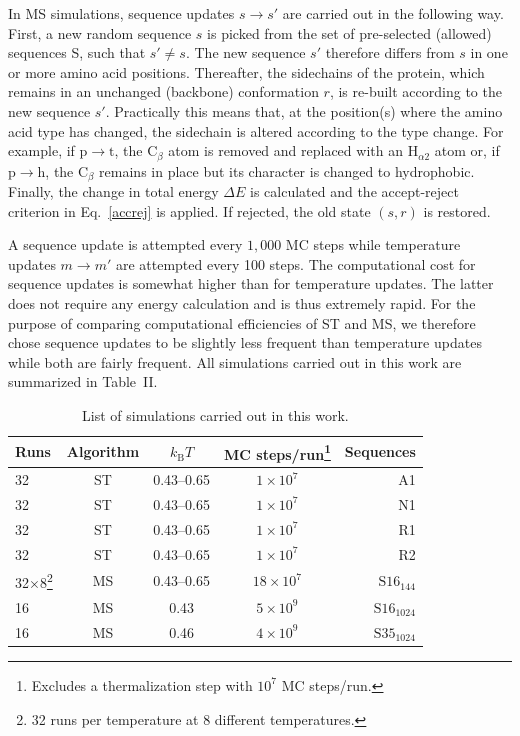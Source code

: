 \documentclass[
aip,
rsi,%
amsmath,amssymb,
reprint,%
]{revtex4-1}
\newcommand	 {\sbar}	{{s}}
\newcommand	 {\rbar}	{{r}}
\newcommand	 {\kb}		{{k_\mathrm{B}}}
\begin{document}
{\color{red}In MS simulations, sequence updates $\sbar\rightarrow\sbar'$ are carried out in the following way. First, a new random sequence $\sbar$ is picked from the set of pre-selected (allowed) sequences S, such that $\sbar'\ne\sbar$. The new sequence $\sbar'$ therefore differs from $\sbar$ in one or more amino acid positions. Thereafter, the sidechains of the protein, which remains in an unchanged (backbone) conformation $\rbar$, is re-built according to the new sequence $\sbar'$. Practically this means that, at the position(s) where the amino acid type has changed, the sidechain is altered according to the type change. For example, if $\mathrm{p}\rightarrow\mathrm{t}$, the $\mathrm{C}_\beta$ atom is removed and replaced with an $\mathrm{H}_{\alpha 2}$ atom or, if $\mathrm{p}\rightarrow\mathrm{h}$, the $\mathrm{C}_\beta$ remains in place but its character is changed to hydrophobic. Finally, the change in total energy $\Delta E$ is calculated and the accept-reject criterion in Eq.~\ref{accrej} is applied. If rejected, the old state $(\sbar,\rbar)$ is restored.} 

A sequence update is attempted every $1,000$ MC steps while temperature updates $m\rightarrow m'$ are attempted every 100 steps. {\color{red}The computational cost for sequence updates is somewhat higher than for temperature updates. The latter does not require any energy calculation and is thus extremely rapid. For the purpose of comparing computational efficiencies of ST and MS, we therefore chose sequence updates to be slightly less frequent than temperature updates while both are fairly frequent.} All simulations carried out in this work are summarized in Table~II.

\begin{table}
\caption{\label{tab2} List of simulations carried out in this work. }
\begin{ruledtabular}
\begin{tabular}{lcccr}
Runs & Algorithm & $\kb T$  & MC steps/run\footnote{Excludes a thermalization step with {\color{red} $10^7$} MC steps/run.} &  Sequences\\
\hline
32 & ST & 0.43--0.65 & $1\times10^7$ &A1\\ 
32 & ST & 0.43--0.65 & $1\times10^7$ &N1\\ 
32 & ST & 0.43--0.65 & $1\times10^7$ &R1\\ 
32 & ST & 0.43--0.65 & $1\times10^7$ &R2\\ 
32$\times$8\footnote{32 runs per temperature at 8 different temperatures.} & MS &0.43--0.65& $18\times 10^7$ & $\mathrm{S16}_{144}$\\
16 & MS & 0.43  & $5\times 10^9$ &  $\mathrm{S16}_{1024}$ \\
16 & MS & 0.46 & $4\times 10^9$ &  $\mathrm{S35}_{1024}$ \\
\end{tabular}
\end{ruledtabular}
\end{table}
\end{document}
